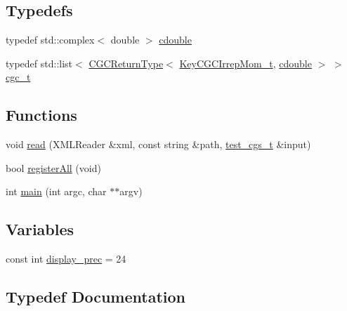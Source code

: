 \subsection*{Typedefs}
\begin{DoxyCompactItemize}
\item 
typedef std\+::complex$<$ double $>$ \mbox{\hyperlink{adat-devel_2main_2irreputils_2cgs__table_8cc_a5f9966666d076841002cd443622b7ccd}{cdouble}}
\item 
typedef std\+::list$<$ \mbox{\hyperlink{structHadron_1_1CGCReturnType}{C\+G\+C\+Return\+Type}}$<$ \mbox{\hyperlink{structHadron_1_1KeyCGCIrrepMom__t}{Key\+C\+G\+C\+Irrep\+Mom\+\_\+t}}, \mbox{\hyperlink{namespaceHadron_1_1CGC_a52d2b70e6792726fb525eab94daae53b}{cdouble}} $>$ $>$ \mbox{\hyperlink{adat-devel_2main_2irreputils_2cgs__table_8cc_a3c0cc566063b4e9f9351ef99884395b3}{cgc\+\_\+t}}
\end{DoxyCompactItemize}
\subsection*{Functions}
\begin{DoxyCompactItemize}
\item 
void \mbox{\hyperlink{adat-devel_2main_2irreputils_2cgs__table_8cc_a0bc6eab6ee4938b14f32a0a933d96dd9}{read}} (X\+M\+L\+Reader \&xml, const string \&path, \mbox{\hyperlink{structtest__cgs__t}{test\+\_\+cgs\+\_\+t}} \&input)
\item 
bool \mbox{\hyperlink{adat-devel_2main_2irreputils_2cgs__table_8cc_a3872416cf70cb24d7da1008a3f3b1d96}{register\+All}} (void)
\item 
int \mbox{\hyperlink{adat-devel_2main_2irreputils_2cgs__table_8cc_a3c04138a5bfe5d72780bb7e82a18e627}{main}} (int argc, char $\ast$$\ast$argv)
\end{DoxyCompactItemize}
\subsection*{Variables}
\begin{DoxyCompactItemize}
\item 
const int \mbox{\hyperlink{adat-devel_2main_2irreputils_2cgs__table_8cc_a473744fa8268c6d49feba30498a6cace}{display\+\_\+prec}} = 24
\end{DoxyCompactItemize}


\subsection{Typedef Documentation}
\mbox{\label{adat-devel_2main_2irreputils_2cgs__table_8cc_a5f9966666d076841002cd443622b7ccd}} 
